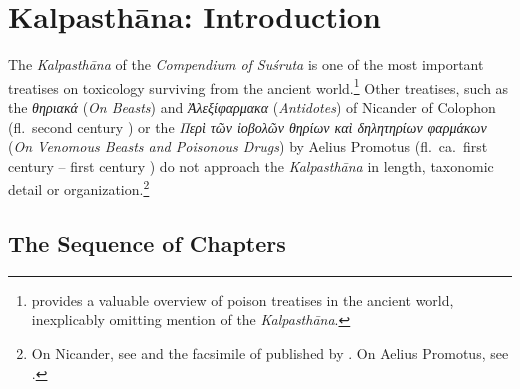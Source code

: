 \chapter{Kalpasthāna: Introduction}

The \emph{Kalpasthāna} of the \emph{Compendium of Suśruta} is one of
the most important treatises on toxicology surviving from the ancient
world.\footnote{\citet{liu-2021} provides a valuable overview of
    poison treatises in the ancient world, inexplicably omitting mention
    of the \emph{Kalpasthāna}.} Other treatises, such as the
    \emph{\textgreek{θηριακά}} (\emph{On Beasts}) and
    \emph{\textgreek{Ἀλεξίφαρμακα}} (\emph{Antidotes}) of Nicander of
    Colophon (fl.\ second century \BCE) or the \emph{\textgreek{Περὶ τῶν
            ἰοβολῶν θηρίων καὶ δηλητηρίων φαρμάκων}} (\emph{On Venomous 
            Beasts and
        Poisonous Drugs}) by Aelius Promotus (fl.\ ca.\ first century \BCE --
    first century \CE) do not approach the \emph{Kalpasthāna} in length,
    taxonomic detail or organization.\footnote{On Nicander, see
        \cite{gow-1953} and the facsimile of 
        published by \citet{touw-1997}.  On Aelius Promotus, see
        \cites[29]{smit-1870}[363--368]{gost-1897}{ihm-1995}.}


\section{The Sequence of Chapters}
\label{kalpa-chapter-sequence}

